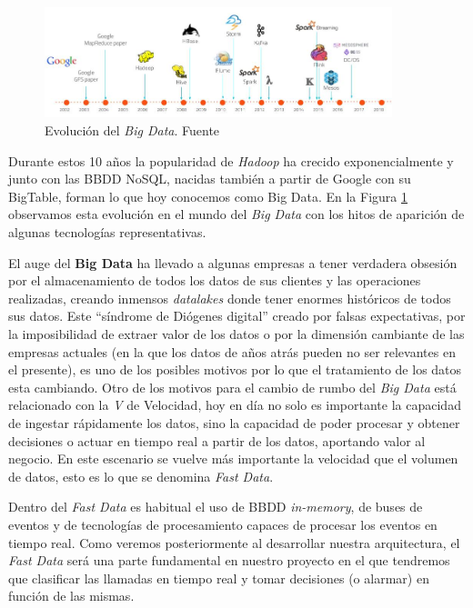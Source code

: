 \begin{figure}[!ht]
	\centering
	\includegraphics[width=0.90\textwidth]{images/arte/bigdatatime}
	\caption{Evolución del \textit{Big Data}. Fuente \cite{lambdakappa}}
	\label{fig:bigdatatime}
\end{figure}


Durante estos 10 años la popularidad de \textit{Hadoop} ha crecido exponencialmente y junto con las BBDD NoSQL, nacidas también a partir de Google con su BigTable, forman lo que hoy conocemos como Big Data. En la Figura \ref{fig:bigdatatime} observamos esta evolución en el mundo del \textit{Big Data} con los hitos de aparición de algunas tecnologías representativas.



El auge del \textbf{Big Data} ha llevado a algunas empresas a tener verdadera obsesión por el almacenamiento de todos los datos de sus clientes y las operaciones realizadas, creando inmensos \textit{datalakes} donde tener enormes históricos de todos sus datos. Este ``síndrome de Diógenes digital'' creado por falsas expectativas, por la imposibilidad de extraer valor de los datos o por la dimensión cambiante de las empresas actuales (en la que los datos de años atrás pueden no ser relevantes en el presente), es uno de los posibles motivos por lo que el tratamiento de los datos esta cambiando. Otro de los motivos para el cambio de rumbo del \textit{Big Data} está relacionado con la \textit{V} de Velocidad, hoy en día no solo es importante la capacidad de ingestar rápidamente los datos, sino la capacidad de poder procesar y obtener decisiones o actuar en tiempo real a partir de los datos, aportando valor al negocio. En este escenario se vuelve más importante la velocidad que el volumen de datos, esto es lo que se denomina \textit{Fast Data}. 



Dentro del \textit{Fast Data} es habitual el uso de BBDD \textit{in-memory}, de buses de eventos y de tecnologías de procesamiento capaces de procesar los eventos en tiempo real. Como veremos posteriormente al desarrollar nuestra arquitectura, el \textit{Fast Data} será una parte fundamental en nuestro proyecto en el que tendremos que clasificar las llamadas en tiempo real y tomar decisiones (o alarmar) en función de las mismas. 

